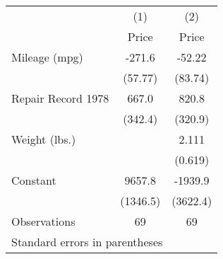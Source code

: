 \begin{tabular}{l*{2}{c}}
\hline\hline
                    &\multicolumn{1}{c}{(1)}&\multicolumn{1}{c}{(2)}\\
                    &\multicolumn{1}{c}{Price}&\multicolumn{1}{c}{Price}\\
\hline
Mileage (mpg)       &      -271.6&      -52.22\\
                    &     (57.77)&     (83.74)\\
[1em]
Repair Record 1978  &       667.0&       820.8\\
                    &     (342.4)&     (320.9)\\
[1em]
Weight (lbs.)       &            &       2.111\\
                    &            &     (0.619)\\
[1em]
Constant            &      9657.8&     -1939.9\\
                    &    (1346.5)&    (3622.4)\\
\hline
Observations        &          69&          69\\
\hline\hline
\multicolumn{3}{l}{\footnotesize Standard errors in parentheses}\\
\end{tabular}
